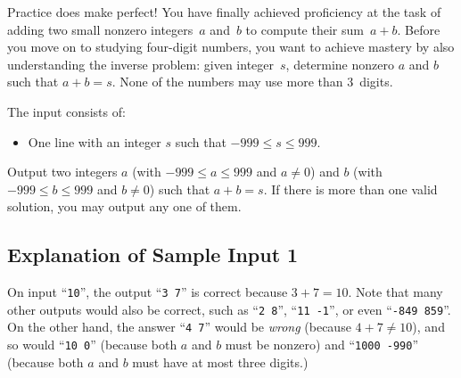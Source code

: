 

\newcommand{\maxa}{999}
\newcommand{\maxb}{999}
\newcommand{\maxs}{999}

Practice does make perfect!
You have finally achieved proficiency at the task of adding two small nonzero integers~$a$ and~$b$ to compute their sum~$a+b$.
Before you move on to studying four-digit numbers,
you want to achieve mastery by also understanding the inverse problem: 
given integer~$s$, determine nonzero $a$ and $b$ such that $a+b=s$.
None of the numbers may use more than $3$~digits.


\begin{Input}
    The input consists of:
    \begin{itemize}
        \item One line with an integer $s$ such that $-\maxs\leq s\leq \maxs$.
    \end{itemize}
\end{Input}

\begin{Output}
  Output two integers
  $a$ (with $-\maxa\leq a\leq \maxa$ and $a\neq 0$) 
  and 
  $b$ (with $-\maxb\leq b\leq \maxb$ and $b\neq 0$) 
  such that $a+b=s$.
  If there is more than one valid solution, you may output any one of them.
\end{Output}

\subsection*{Explanation of Sample Input 1}

On input ``\texttt{10}'', the output ``\texttt{3 7}'' is correct because $3+7=10$.
Note that many other outputs would also be correct, such as ``\texttt{2 8}'', ``\texttt{11 -1}'', or even ``\texttt{-849 859}''.
On the other hand, the answer ``\texttt{4 7}'' would be \emph{wrong} (because $4+7\neq 10$), 
and so would ``\texttt{10 0}'' (because both $a$ and $b$ must be nonzero) 
and ``\texttt{1000 -990}'' (because both $a$ and $b$ must have at most three digits.)
